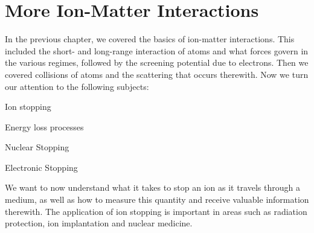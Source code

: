 

\chapter{More Ion-Matter Interactions}\label{ch:more-ion-matter-interactions}
In the previous chapter, we covered the basics of ion-matter interactions.
This included the short- and long-range interaction of atoms and what forces govern in the various regimes, followed by the screening potential due to electrons.
Then we covered collisions of atoms and the scattering that occurs therewith.
Now we turn our attention to the following subjects:
\begin{myitemize}
	\item Ion stopping
	\item Energy loss processes
	\item Nuclear Stopping
	\item Electronic Stopping
\end{myitemize}

We want to now understand what it takes to stop an ion as it travels through a medium, as well as how to measure this quantity and receive valuable information therewith.
The application of ion stopping is important in areas such as radiation protection, ion implantation and nuclear medicine.

